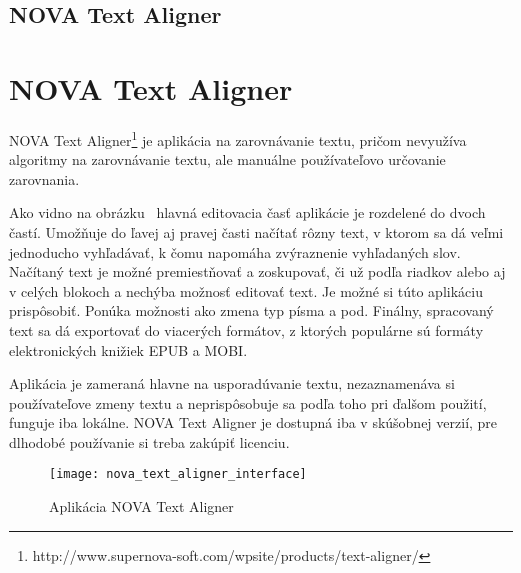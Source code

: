 %
%
{
	\subsection{NOVA Text Aligner}
}
{
	\section{NOVA Text Aligner}
}
NOVA Text Aligner\footnote{http://www.supernova-soft.com/wpsite/products/text-aligner/} je aplikácia na zarovnávanie textu, pričom nevyužíva algoritmy na zarovnávanie textu, ale manuálne používateľovo určovanie zarovnania.

Ako vidno na obrázku~ hlavná editovacia časť aplikácie je rozdelené do dvoch častí. Umožňuje do ľavej aj pravej časti načítať rôzny text, v ktorom sa dá veľmi jednoducho vyhľadávať, k čomu napomáha zvýraznenie vyhľadaných slov. Načítaný text je možné premiestňovať a zoskupovať, či už podľa riadkov alebo aj v celých blokoch a nechýba možnosť editovať text. Je možné si túto aplikáciu prispôsobiť. Ponúka možnosti ako zmena typ písma a pod. Finálny, spracovaný text sa dá exportovať do viacerých formátov, z ktorých populárne sú formáty elektronických knižiek EPUB a MOBI.

Aplikácia je zameraná hlavne na usporadúvanie textu, nezaznamenáva si používateľove zmeny textu a neprispôsobuje sa podľa toho pri ďalšom použití, funguje iba lokálne. NOVA Text Aligner je dostupná iba v skúšobnej verzií, pre dlhodobé používanie si treba zakúpiť licenciu.

\begin{figure}[H]
	\begin{center}\texttt{[image: nova\_text\_aligner\_interface]}\end{center}
	\caption[Aplikácia NOVA Text Aligner]{Aplikácia NOVA Text Aligner\footnotemark}\label{fig:nova_text_aligner_interface}
\end{figure}

